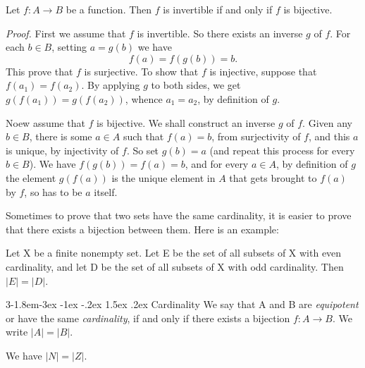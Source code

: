 \documentclass{tufte-handout}
\makeatletter
\renewcommand{\subsection}{\@startsection{subsection}%
    {3}{-1.8em}{-3ex \@plus -1ex \@minus -.2ex}%
    {1.5ex \@plus .2ex}
    {\hspace*{-5.5em}\fcolorbox{ltblue}{ltblue}{\parbox[c][1.0ex][b]{4em}{\phantom{space}}}
    \normalfont\large\itshape\color{ltblue}}}
\makeatother
\begin{document}
\begin{Proposition}
    Let \( f:A\to B \) be a function. Then \( f \) is invertible if and only if
    \( f  \) is bijective.
\end{Proposition}

\textit{Proof.} First we assume that \( f \) is invertible. So there exists an inverse \( g  \) of \( f  \).
For each \( b \in B  \), setting \( a = g(b ) \) we have 
\[ f(a) = f(g(b)) = b. \]
This prove that \( f \) is surjective. To show that \( f \) is injective, suppose that \( f(a_1) = f(a_2) \).
By applying \( g \) to both sides, we get \(g(f(a_1)) = g(f(a_2)) \), whence \( a_1 = a_2 \), by definition of \( g \).

Noew assume that \( f \) is bijective. We shall construct an inverse \( g \) of \( f \). Given any \( b \in B \),
there is some \( a \in A \) such that \( f(a) = b \), from surjectivity of \( f \), and
this \( a \) is unique, by injectivity of \( f \). So set \( g(b) = a \) (and repeat this process for
every \( b \in B \)). We have \( f(g(b)) = f(a) = b \), and for every \( a \in A \), by definition of \( g \)
the element \( g(f(a)) \) is the unique element in \( A \) that gets brought to \( f(a) \) by \( f \), so
has to be \( a \) itself. \hfill \qedsymbol

Sometimes to prove that two sets have the same cardinality, it is easier to prove that there exists
a bijection between them. Here is an example:
\begin{Proposition}
    \label{prop:even_odd_cardinality}
    Let X be a finite nonempty set. Let E be the set of all subsets of X with even cardinality, and
    let D be the set of all subsets of X with odd cardinality. Then \( \left|E\right| = \left|D\right| \).
\end{Proposition}

\subsection{Cardinality}
We say that A and B are \textit{equipotent} or have the same \textit{cardinality}, 
if and only if there exists a bijection \( f:A\to B \). We write \( \left|A\right| = \left|B\right| \).


\begin{Theorem}
    We have \( \left|N\right| = \left|Z \right| \).
\end{Theorem}
\end{document}
